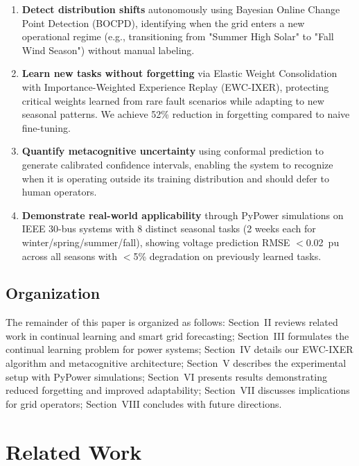 \documentclass[journal]{IEEEtran}
\begin{document}
\begin{enumerate}
    \item \textbf{Detect distribution shifts} autonomously using Bayesian Online Change Point Detection (BOCPD), identifying when the grid enters a new operational regime (e.g., transitioning from "Summer High Solar" to "Fall Wind Season") without manual labeling.
    
    \item \textbf{Learn new tasks without forgetting} via Elastic Weight Consolidation with Importance-Weighted Experience Replay (EWC-IXER), protecting critical weights learned from rare fault scenarios while adapting to new seasonal patterns. We achieve 52\% reduction in forgetting compared to naive fine-tuning.
    
    \item \textbf{Quantify metacognitive uncertainty} using conformal prediction to generate calibrated confidence intervals, enabling the system to recognize when it is operating outside its training distribution and should defer to human operators.
    
    \item \textbf{Demonstrate real-world applicability} through PyPower simulations on IEEE 30-bus systems with 8 distinct seasonal tasks (2 weeks each for winter/spring/summer/fall), showing voltage prediction RMSE $<$0.02~pu across all seasons with $<$5\% degradation on previously learned tasks.
\end{enumerate}

\subsection{Organization}

The remainder of this paper is organized as follows: Section~II reviews related work in continual learning and smart grid forecasting; Section~III formulates the continual learning problem for power systems; Section~IV details our EWC-IXER algorithm and metacognitive architecture; Section~V describes the experimental setup with PyPower simulations; Section~VI presents results demonstrating reduced forgetting and improved adaptability; Section~VII discusses implications for grid operators; Section~VIII concludes with future directions.

\section{Related Work}
\end{document}
